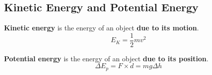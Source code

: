 \subsection{Kinetic Energy and Potential Energy}

\textbf{Kinetic energy} is the energy of an object \textbf{due to its motion}.
$$E_K=\frac{1}{2}mv^2$$

\textbf{Potential energy} is the energy of an object \textbf{due to its position}.
$$\Delta E_p=F\times d=mg\Delta h$$
